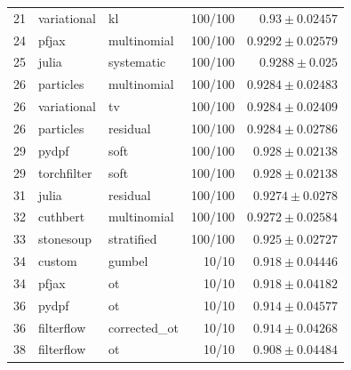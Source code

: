\begin{table}[!htbp]
\begin{tabular}{rllrr}
21 & variational & kl & 100/100 & $0.93 \pm 0.02457$ \\
24 & pfjax & multinomial & 100/100 & $0.9292 \pm 0.02579$ \\
25 & julia & systematic & 100/100 & $0.9288 \pm 0.025$ \\
26 & particles & multinomial & 100/100 & $0.9284 \pm 0.02483$ \\
26 & variational & tv & 100/100 & $0.9284 \pm 0.02409$ \\
26 & particles & residual & 100/100 & $0.9284 \pm 0.02786$ \\
29 & pydpf & soft & 100/100 & $0.928 \pm 0.02138$ \\
29 & torchfilter & soft & 100/100 & $0.928 \pm 0.02138$ \\
31 & julia & residual & 100/100 & $0.9274 \pm 0.0278$ \\
32 & cuthbert & multinomial & 100/100 & $0.9272 \pm 0.02584$ \\
33 & stonesoup & stratified & 100/100 & $0.925 \pm 0.02727$ \\
34 & custom & gumbel & 10/10 & $0.918 \pm 0.04446$ \\
34 & pfjax & ot & 10/10 & $0.918 \pm 0.04182$ \\
36 & pydpf & ot & 10/10 & $0.914 \pm 0.04577$ \\
36 & filterflow & corrected\_ot & 10/10 & $0.914 \pm 0.04268$ \\
38 & filterflow & ot & 10/10 & $0.908 \pm 0.04484$ \\
\bottomrule
\end{tabular}
\end{table}

